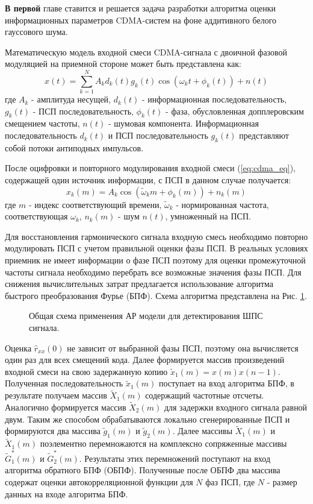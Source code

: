 {\bf{В первой}} главе ставится и решается задача разработки алгоритма оценки информационных параметров CDMA-систем на фоне аддитивного белого гауссового шума.

Математическую модель входной смеси CDMA-сигнала с двоичной фазовой модуляцией на приемной стороне может быть представлена как:
\begin{equation}
	\label{eq:cdma_eq}
	x(t)=\sum\limits_{k=1}^{N}A_k d_k(t)g_k(t)\cos{(\omega_{k}t + \phi_k(t))} + n(t)
\end{equation}
где ${A_k}$ - амплитуда несущей, ${d_k}(t)$ - информационная последовательность, ${g_k}(t)$ - ПСП последовательность, ${\phi_k(t)}$ - фаза, обусловленная допплеровским смещением частоты, 
${n(t)}$ - шумовая компонента. Информационная последовательность ${d_k}(t)$ и ПСП последовательность ${g_k}(t)$ представляют собой потоки антиподных импульсов.

После оцифровки и повторного модулирования входной смеси (\ref{eq:cdma_eq}), содержащей один источник информации, с ПСП в данном случае получается:
\begin{equation}
	\label{eq:cdma_strip_eq}
	x_k(m) = A_k \cos{(\tilde{\omega}_{k}m + \phi_k(m))} + n_k(m)
\end{equation}
где ${m}$ - индекс соответствующий времени, ${\tilde{\omega}_k}$ - нормированная частота, соответствующая ${\omega_k}$, ${n_k}(m)$ - шум ${n(t)}$, умноженный на ПСП.

Для восстановления гармонического сигнала входную смесь необходимо повторно модулировать ПСП с учетом правильной оценки фазы ПСП.
В реальных условиях приемник не имеет информации о фазе ПСП поэтому для оценки промежуточной частоты 
сигнала необходимо перебрать все возможные значения фазы ПСП. Для снижения вычислительных затрат предлагается использование алгоритма быстрого преобразования Фурье (БПФ).
Схема алгоритма представлена на Рис. \ref{pic:ar_cdma1_scheme2}.
\begin{figure}[h]
	\center{}
	\caption{Общая схема применения АР модели для детектирования ШПС сигнала.}
	\label{pic:ar_cdma1_scheme2}
\end{figure}

Оценка ${\hat{r}_{xx}(0)}$ не зависит от выбранной фазы ПСП, поэтому она вычисляется один
раз для всех смещений кода. Далее формируется массив произведений входной смеси на
свою задержанную копию ${\tilde{x}_1(m)=x(m)x(n-1)}$. Полученная последовательность  
${\tilde{x}_1(m)}$ поступает на вход алгоритма БПФ, в результате получаем массив ${\tilde{X}_1(m)}$
содержащий частотные отсчеты. Аналогично формируется массив  ${\tilde{X}_2(m)}$ для
задержки входного сигнала равной двум. Таким же способом обрабатываются локально
сгенерированные ПСП и формируются два массива ${\tilde{g}_1(m)}$ и ${\tilde{g}_2(m)}$.
Далее массивы ${\tilde{X}_1(m)}$ и ${\tilde{X}_1(m)}$ поэлементно перемножаются
на комплексно сопряженные массивы ${\tilde{G}_1^*(m)}$ и ${\tilde{G}_2^*(m)}$.
Результаты этих перемножений поступают на вход алгоритма обратного
БПФ (ОБПФ). Полученные после ОБПФ два массива содержат оценки автокорреляционной функции для ${N}$ 
фаз ПСП, где  ${N}$ - размер данных на входе алгоритма БПФ.

